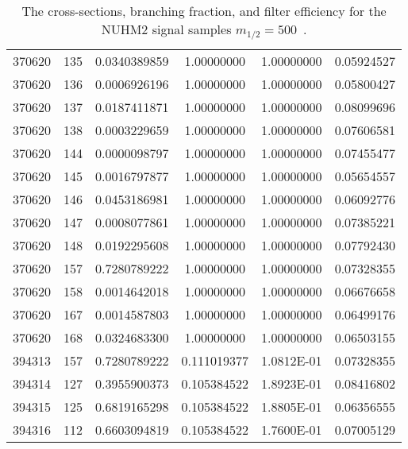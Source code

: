 \begin{table}[htp]
{{\begin{tabular}{cccccc}
370620 & 135         & 0.0340389859         & 1.00000000  & 1.00000000        & 0.05924527\\
370620 & 136         & 0.0006926196         & 1.00000000  & 1.00000000        & 0.05800427\\
370620 & 137         & 0.0187411871         & 1.00000000  & 1.00000000        & 0.08099696\\
370620 & 138         & 0.0003229659         & 1.00000000  & 1.00000000        & 0.07606581\\
370620 & 144         & 0.0000098797         & 1.00000000  & 1.00000000        & 0.07455477\\
370620 & 145         & 0.0016797877         & 1.00000000  & 1.00000000        & 0.05654557\\
370620 & 146         & 0.0453186981         & 1.00000000  & 1.00000000        & 0.06092776\\
370620 & 147         & 0.0008077861         & 1.00000000  & 1.00000000        & 0.07385221\\
370620 & 148         & 0.0192295608         & 1.00000000  & 1.00000000        & 0.07792430\\
370620 & 157         & 0.7280789222         & 1.00000000  & 1.00000000        & 0.07328355\\
370620 & 158         & 0.0014642018         & 1.00000000  & 1.00000000        & 0.06676658\\
370620 & 167         & 0.0014587803         & 1.00000000  & 1.00000000        & 0.06499176\\
370620 & 168         & 0.0324683300         & 1.00000000  & 1.00000000        & 0.06503155\\
394313 & 157         & 0.7280789222         & 0.111019377 & 1.0812E-01        & 0.07328355\\
394314 & 127         & 0.3955900373         & 0.105384522 & 1.8923E-01        & 0.08416802\\
394315 & 125         & 0.6819165298         & 0.105384522 & 1.8805E-01        & 0.06356555\\
394316 & 112         & 0.6603094819         & 0.105384522 & 1.7600E-01        & 0.07005129\\
\hline
\hline
\end{tabular}
}
}
\caption{The cross-sections, branching fraction, and filter efficiency for the NUHM2 signal samples $m_{1/2} = 500$~{\GeV}.}
\label{tab:app_xsec_m12_500}
\end{table}%

